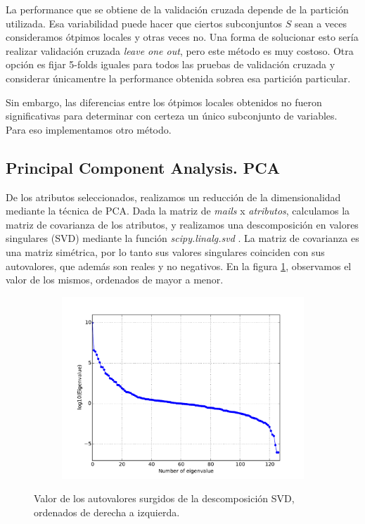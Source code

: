 \documentclass[a4paper,10pt]{article}
\begin{document}
La performance que se obtiene de la validaci\'on cruzada depende de la partici\'on utilizada. Esa variabilidad puede hacer que ciertos subconjuntos $S$ sean a veces consideramos \'otpimos locales y otras veces no. Una forma de solucionar esto ser\'ia realizar validaci\'on cruzada \emph{leave one out}, pero este m\'etodo es muy costoso. Otra opci\'on es fijar 5-folds iguales para todos las pruebas de validaci\'on cruzada y considerar \'unicamentre la performance obtenida sobrea esa partici\'on particular.  

Sin embargo, las diferencias entre los \'otpimos locales obtenidos no fueron significativas para determinar con certeza un \'unico subconjunto de variables. Para eso implementamos otro m\'etodo. 

\subsection{Principal Component Analysis. PCA}

\par De los atributos seleccionados, realizamos un reducción de la dimensionalidad
mediante la técnica de PCA. Dada la matriz de \emph{mails} x \emph{atributos},
calculamos la matriz de covarianza de los atributos, y realizamos una descomposición en valores singulares (SVD) mediante la funci\'on \emph{scipy.linalg.svd} \cite{scipy}. La matriz de covarianza es una matriz simétrica, por lo tanto sus valores singulares coinciden con sus autovalores, que además son reales y no negativos. En la figura \ref{fig:autovalores}, observamos el valor de los mismos, ordenados de mayor a menor. 
  \begin{figure}[H]
    \centering
    \begin{subfigure}[b]{0.4\textwidth}
      \includegraphics[width=\textwidth]{../imagenes/Autovalores}
    \end{subfigure}
    \caption{Valor de los autovalores surgidos de la descomposición SVD, ordenados de derecha a izquierda.}
    \label{fig:autovalores}
  \end{figure}
\end{document}
